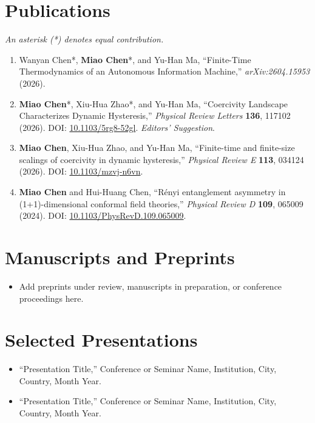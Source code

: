 \documentclass[11pt,a4paper]{article}
\newcommand{\pubitem}[1]{\item \justifying #1}
\begin{document}
\section{Publications}
\textit{An asterisk (*) denotes equal contribution.}
\begin{enumerate}
  \pubitem{Wanyan Chen*, \textbf{Miao Chen}*, and Yu-Han Ma, ``Finite-Time Thermodynamics of an Autonomous Information Machine,'' \textit{arXiv:2604.15953} (2026).}

  \pubitem{\textbf{Miao Chen}*, Xiu-Hua Zhao*, and Yu-Han Ma, ``Coercivity Landscape Characterizes Dynamic Hysteresis,'' \textit{Physical Review Letters} \textbf{136}, 117102 (2026). DOI: \href{https://doi.org/10.1103/5rg8-52gl}{10.1103/5rg8-52gl}. \textit{Editors' Suggestion}.}

  \pubitem{\textbf{Miao Chen}, Xiu-Hua Zhao, and Yu-Han Ma, ``Finite-time and finite-size scalings of coercivity in dynamic hysteresis,'' \textit{Physical Review E} \textbf{113}, 034124 (2026). DOI: \href{https://doi.org/10.1103/mzvj-n6vn}{10.1103/mzvj-n6vn}.}

  \pubitem{\textbf{Miao Chen} and Hui-Huang Chen, ``R\'enyi entanglement asymmetry in (1+1)-dimensional conformal field theories,'' \textit{Physical Review D} \textbf{109}, 065009 (2024). DOI: \href{https://doi.org/10.1103/PhysRevD.109.065009}{10.1103/PhysRevD.109.065009}.}
\end{enumerate}

\section{Manuscripts and Preprints}
\begin{itemize}
  \item Add preprints under review, manuscripts in preparation, or conference proceedings here.
\end{itemize}

\section{Selected Presentations}
\begin{itemize}
  \item ``Presentation Title,'' Conference or Seminar Name, Institution, City, Country, Month Year.
  \item ``Presentation Title,'' Conference or Seminar Name, Institution, City, Country, Month Year.
\end{itemize}
\end{document}
